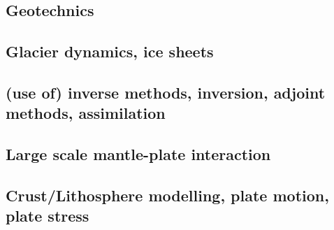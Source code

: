 \subsection*{Geotechnics}

\cite{zhll03}

\subsection*{Glacier dynamics, ice sheets}

\noindent
\cite{asbl06}
\cite{zhjg11}
\cite{lejx14}
\cite{issg15}\cite{frlg15}

\subsection*{(use of) inverse methods, inversion, adjoint methods, assimilation}

\noindent
\cite{buht03}
\cite{isst04}
\cite{isks07}
\cite{wama09}
\cite{wosp14}\cite{hobo14}
\cite{wahg15}
\cite{ghbu16}\cite{bocf16}
\cite{ligs17}
\cite{bofc18}

\subsection*{Large scale mantle-plate interaction}

\cite{wamg10}\cite{golw00}
\cite{algs12}\cite{roct12}
\cite{ghbh13}

\subsection*{Crust/Lithosphere modelling, plate motion, plate stress}


